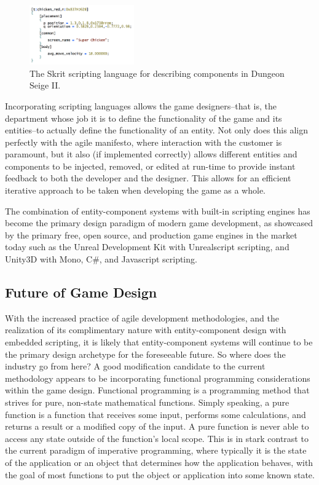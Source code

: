 \begin{figure}[!ht]
  \centering \includegraphics[width=0.4\textwidth]{Images/skrit.png}
	\caption{The Skrit scripting language for describing components in Dungeon Seige II\cite{bilas2002data}.}
\end{figure}

Incorporating scripting languages allows the game designers--that is, the department whose job it is to define the functionality of the game and its entities--to actually define the functionality of an entity. Not only does this align perfectly with the agile manifesto, where interaction with the customer is paramount, but it also (if implemented correctly) allows different entities and components to be injected, removed, or edited at run-time to provide instant feedback to both the developer and the designer. This allows for an efficient iterative approach to be taken when developing the game as a whole.

The combination of entity-component systems with built-in scripting engines has become the primary design paradigm of modern game development, as showcased by the primary free, open source, and production game engines in the market today such as the Unreal Development Kit with Unrealscript scripting, and Unity3D with Mono, C\#, and Javascript scripting.

\subsection{Future of Game Design}

With the increased practice of agile development methodologies, and the realization of its complimentary nature with entity-component design with embedded scripting, it is likely that entity-component systems will continue to be the primary design archetype for the foreseeable future. So where does the industry go from here? A good modification candidate to the current methodology appears to be incorporating functional programming considerations within the game design. Functional programming is a programming method that strives for pure, non-state mathematical functions. Simply speaking, a pure function is a function that receives some input, performs some calculations, and returns a result or a modified copy of the input. A pure function is never able to access any state outside of the function's local scope. This is in stark contrast to the current paradigm of imperative programming, where typically it is the state of the application or an object that determines how the application behaves, with the goal of most functions to put the object or application into some known state.

